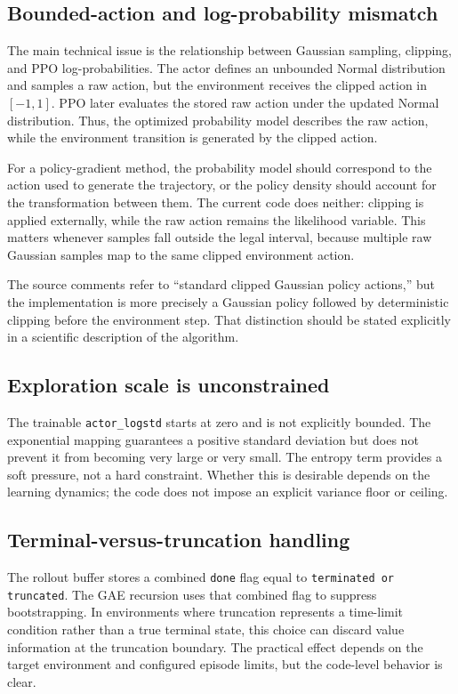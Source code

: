 \documentclass[11pt,a4paper]{article}
\begin{document}
\subsection{Bounded-action and log-probability mismatch}
The main technical issue is the relationship between Gaussian sampling, clipping, and PPO log-probabilities. The actor defines an unbounded Normal distribution and samples a raw action, but the environment receives the clipped action in $[-1,1]$. PPO later evaluates the stored raw action under the updated Normal distribution. Thus, the optimized probability model describes the raw action, while the environment transition is generated by the clipped action.

For a policy-gradient method, the probability model should correspond to the action used to generate the trajectory, or the policy density should account for the transformation between them. The current code does neither: clipping is applied externally, while the raw action remains the likelihood variable. This matters whenever samples fall outside the legal interval, because multiple raw Gaussian samples map to the same clipped environment action.

The source comments refer to “standard clipped Gaussian policy actions,” but the implementation is more precisely a Gaussian policy followed by deterministic clipping before the environment step. That distinction should be stated explicitly in a scientific description of the algorithm.

\subsection{Exploration scale is unconstrained}
The trainable \texttt{actor\_logstd} starts at zero and is not explicitly bounded. The exponential mapping guarantees a positive standard deviation but does not prevent it from becoming very large or very small. The entropy term provides a soft pressure, not a hard constraint. Whether this is desirable depends on the learning dynamics; the code does not impose an explicit variance floor or ceiling.

\subsection{Terminal-versus-truncation handling}
The rollout buffer stores a combined \texttt{done} flag equal to \texttt{terminated or truncated}. The GAE recursion uses that combined flag to suppress bootstrapping. In environments where truncation represents a time-limit condition rather than a true terminal state, this choice can discard value information at the truncation boundary. The practical effect depends on the target environment and configured episode limits, but the code-level behavior is clear.
\end{document}
